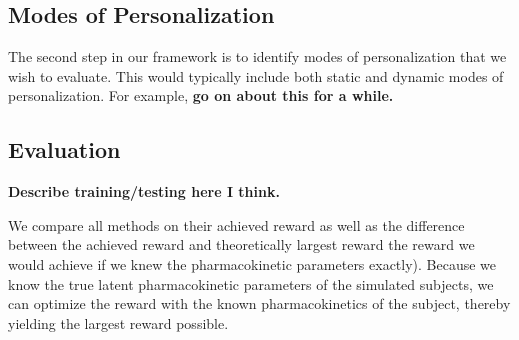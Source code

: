 \subsection{Modes of Personalization}

The second step in our framework is to identify modes of personalization that we wish to evaluate. This would typically include both static and dynamic modes of personalization. For example, \textbf{go on about this for a while.}

\subsection{Evaluation}

\textbf{Describe training/testing here I think.}

We compare all methods on their achieved reward as well as the difference between the achieved reward and theoretically largest reward the reward we would achieve if we knew the pharmacokinetic parameters exactly).  Because we know the true latent pharmacokinetic parameters of the simulated subjects, we can optimize the reward with the known pharmacokinetics of the subject, thereby yielding the largest reward possible.